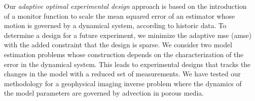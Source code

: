 \documentclass[final,leqno,onefignum,onetabnum]{siamltexmm}
\begin{document}
Our {\em adaptive optimal experimental design} approach is based on the introduction of a monitor function to scale the  mean squared error of an estimator whose motion is governed by a dynamical system, according to historic data. 
To determine a design for a future experiment, we minimize the adaptive mse (amse)  with the added constraint that the design is sparse. We consider two model estimation problems whose construction depends on the characterization of the error in the dynamical system. 
This leads to experimental designs that tracks the changes in the model with a reduced set of measurements.  
We have tested our methodology for a geophysical imaging inverse problem where the dynamics of the  model parameters are governed by advection in porous media. 
%
%
\newpage
%
%
\end{document}
